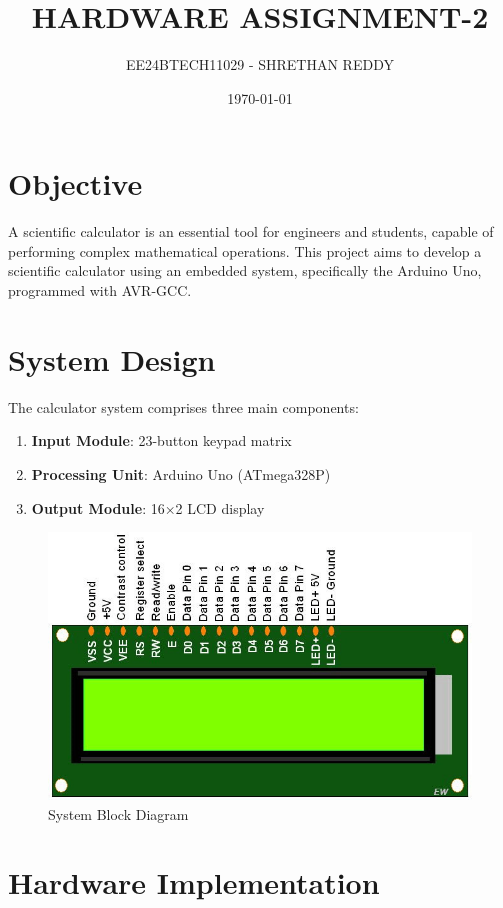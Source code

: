 \documentclass[12pt,a4paper]{article}
\title{HARDWARE ASSIGNMENT-2 }
\author{EE24BTECH11029 - SHRETHAN REDDY}
\date{\today}
\numberwithin{equation}{section}
\numberwithin{figure}{section}
\numberwithin{table}{section}
\begin{document}
\maketitle

\section{Objective}
A scientific calculator is an essential tool for engineers and students, capable of performing complex mathematical operations. This project aims to develop a scientific calculator using an embedded system, specifically the Arduino Uno, programmed with AVR-GCC.

\section{System Design}
The calculator system comprises three main components:
\begin{enumerate}
    \item \textbf{Input Module}: 23-button keypad matrix
    \item \textbf{Processing Unit}: Arduino Uno (ATmega328P)
    \item \textbf{Output Module}: 16×2 LCD display
\end{enumerate}

\begin{figure}[H]
    \centering
    \includegraphics[width=0.8\linewidth]{figure/fig.png}
    \caption{System Block Diagram}
    \label{fig:block_diagram}
\end{figure}

\section{Hardware Implementation}
\end{document}
